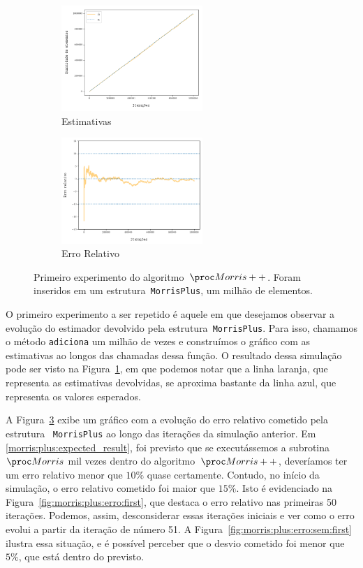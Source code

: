 \begin{figure}
  \centering
  \begin{subfigure}{.5\textwidth}
    \centering
    \includegraphics[height=4cm, width=\linewidth]{figuras/morris_plus_full.png}
    \caption{Estimativas}
    \label{fig:morris:plus:full}
  \end{subfigure}%
  \begin{subfigure}{.5\textwidth}
    \centering
    \captionsetup{justification=centering}
    \includegraphics[width=\linewidth, height=4cm]{figuras/morris_plus_erro_full.png}
	  \caption{Erro Relativo}
    \label{fig:morris:plus:erro:full}
  \end{subfigure}
  \caption{Primeiro experimento do algoritmo~$\Morrispp$. Foram inseridos em um estrutura~\texttt{MorrisPlus}, um milhão
  de elementos.}
\end{figure}

O primeiro experimento a ser repetido é aquele em que desejamos observar a evolução do estimador devolvido pela 
estrutura~\texttt{MorrisPlus}. Para isso, chamamos o método \texttt{adiciona} um milhão de vezes e construímos o 
gráfico com as estimativas ao longos das chamadas dessa função. O resultado dessa simulação pode ser visto na 
Figura~\ref{fig:morris:plus:full}, em que podemos notar que a linha laranja, que representa as estimativas devolvidas, 
se aproxima bastante da linha azul, que representa os valores esperados.

A Figura~\ref{fig:morris:plus:erro:full} exibe um gráfico com a evolução do erro relativo cometido pela estrutura
~\texttt{MorrisPlus} ao longo das iterações da simulação anterior. Em \eqref{morris:plus:expected_result}, foi previsto
que se executássemos a subrotina $\Morris$ mil vezes dentro do algoritmo~$\Morrispp$, deveríamos ter um erro relativo
menor que $10\%$ quase certamente. Contudo, no início da simulação, o erro relativo cometido foi maior que $15\%$. Isto 
é evidenciado na Figura~\ref{fig:morris:plus:erro:first}, que destaca o erro relativo nas primeiras 50 iterações. 
Podemos, assim, desconsiderar essas iterações iniciais e ver como o erro evolui a partir da iteração de número 51. A 
Figura~\ref{fig:morris:plus:erro:sem:first} ilustra essa situação, e é possível perceber que o desvio cometido foi menor
que $5\%$, que está dentro do previsto.

